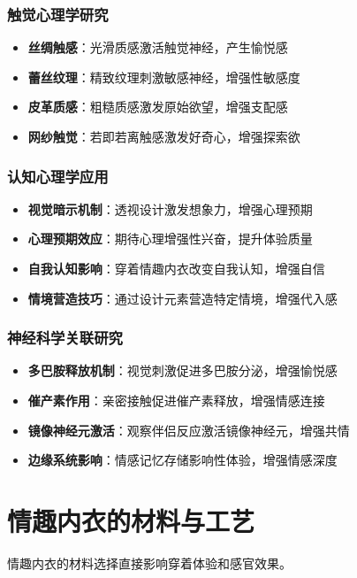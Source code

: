 \documentclass[12pt,UTF8]{ctexbook}
\begin{document}
\subsubsection{触觉心理学研究}
\begin{itemize}[leftmargin=2cm]
	\item \textbf{丝绸触感}：光滑质感激活触觉神经，产生愉悦感
	\item \textbf{蕾丝纹理}：精致纹理刺激敏感神经，增强性敏感度
	\item \textbf{皮革质感}：粗糙质感激发原始欲望，增强支配感
	\item \textbf{网纱触觉}：若即若离触感激发好奇心，增强探索欲
\end{itemize}

\subsubsection{认知心理学应用}
\begin{itemize}[leftmargin=2cm]
	\item \textbf{视觉暗示机制}：透视设计激发想象力，增强心理预期
	\item \textbf{心理预期效应}：期待心理增强性兴奋，提升体验质量
	\item \textbf{自我认知影响}：穿着情趣内衣改变自我认知，增强自信
	\item \textbf{情境营造技巧}：通过设计元素营造特定情境，增强代入感
\end{itemize}

\subsubsection{神经科学关联研究}
\begin{itemize}[leftmargin=2cm]
	\item \textbf{多巴胺释放机制}：视觉刺激促进多巴胺分泌，增强愉悦感
	\item \textbf{催产素作用}：亲密接触促进催产素释放，增强情感连接
	\item \textbf{镜像神经元激活}：观察伴侣反应激活镜像神经元，增强共情
	\item \textbf{边缘系统影响}：情感记忆存储影响性体验，增强情感深度
\end{itemize}

\section{情趣内衣的材料与工艺}
情趣内衣的材料选择直接影响穿着体验和感官效果。
\end{document}
